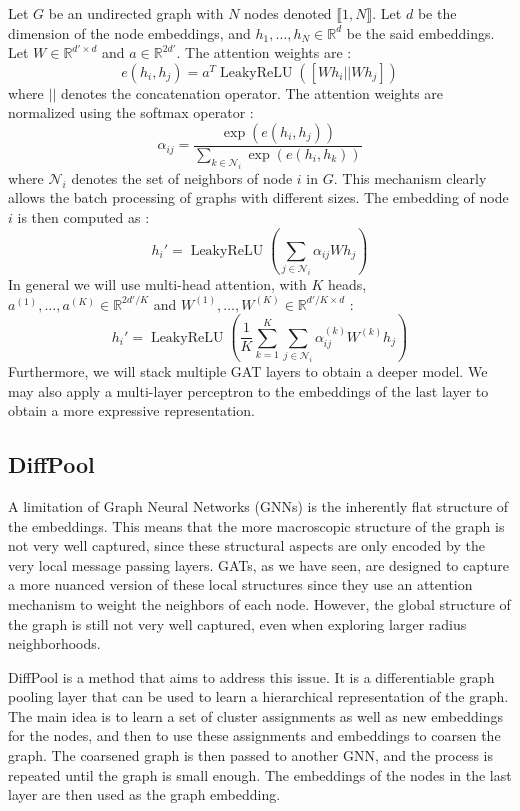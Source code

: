 \documentclass[switch, 12pt]{article}
\DeclareMathOperator{\leakyrelu}{LeakyReLU}
\newcommand{\R}{\mathbb{R}}
\begin{document}
\begin{multicols}{2}
    Let $G$ be an undirected graph with $N$ nodes denoted $\llbracket1, N\rrbracket$. Let $d$ be the dimension of the node embeddings, and $h_1,\dots,h_N\in\R^d$ be the said embeddings. Let $W\in\R^{d'\times d}$ and $a\in\R^{2d'}$. The attention weights are :
    \begin{equation}
        e(h_i,h_j) = a^T \leakyrelu([Wh_i || Wh_j])
    \end{equation}
    where $||$ denotes the concatenation operator. The attention weights are normalized using the softmax operator :
    \begin{equation}
        \alpha_{ij} = \frac{\exp(e(h_i,h_j))}{\sum_{k\in\mathcal{N}_i}\exp(e(h_i,h_k))}
    \end{equation}
    where $\mathcal{N}_i$ denotes the set of neighbors of node $i$ in $G$. This mechanism clearly allows the batch processing of graphs with different sizes. The embedding of node $i$ is then computed as :
    \begin{equation}
        h_i' = \leakyrelu\left(\sum_{j\in\mathcal{N}_i}\alpha_{ij}Wh_j\right)
    \end{equation}
    In general we will use multi-head attention, with $K$ heads, $a^{(1)},\dots,a^{(K)}\in\R^{2d'/K}$ and $W^{(1)},\dots,W^{(K)}\in\R^{d'/K\times d}$ :
    \begin{equation}
        h_i' = \leakyrelu\left(\frac{1}{K}\sum_{k=1}^K\sum_{j\in\mathcal{N}_i}\alpha_{ij}^{(k)}W^{(k)}h_j\right)
    \end{equation}
    Furthermore, we will stack multiple GAT layers to obtain a deeper model. We may also apply a multi-layer perceptron to the embeddings of the last layer to obtain a more expressive representation.


    \subsection{DiffPool}
    A limitation of Graph Neural Networks (GNNs) is the inherently flat structure of the embeddings. This means that the more macroscopic structure of the graph is not very well captured, since these structural aspects are only encoded by the very local message passing layers. GATs, as we have seen, are designed to capture a more nuanced version of these local structures since they use an attention mechanism to weight the neighbors of each node. However, the global structure of the graph is still not very well captured, even when exploring larger radius neighborhoods.

    DiffPool \cite{ying-2018} is a method that aims to address this issue. It is a differentiable graph pooling layer that can be used to learn a hierarchical representation of the graph. The main idea is to learn a set of cluster assignments as well as new embeddings for the nodes, and then to use these assignments and embeddings to coarsen the graph. The coarsened graph is then passed to another GNN, and the process is repeated until the graph is small enough. The embeddings of the nodes in the last layer are then used as the graph embedding.


\end{multicols}
\end{document}
